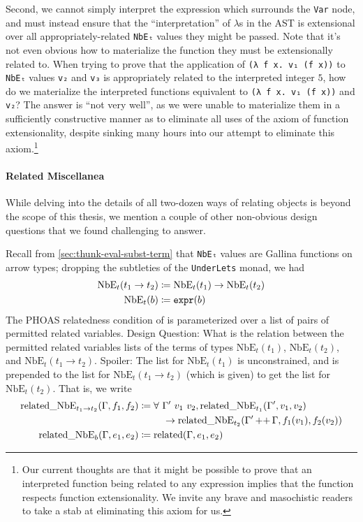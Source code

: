 Second, we cannot simply interpret the expression which surrounds the \texttt{Var} node, and must instead ensure that the ``interpretation'' of $\lambda$s in the AST is extensional over all appropriately-related \texttt{NbEₜ} values they might be passed.
Note that it's not even obvious how to materialize the function they must be extensionally related to.
When trying to prove that the application of \texttt{(λ f x. v₁ (f x))} to \texttt{NbEₜ} values \texttt{v₂} and \texttt{v₃} is appropriately related to the interpreted integer $5$, how do we materialize the interpreted functions equivalent to \texttt{(λ f x. v₁ (f x))} and \texttt{v₂}?
The answer is ``not very well'', as we were unable to materialize them in a sufficiently constructive manner as to eliminate all uses of the axiom of function extensionality, despite sinking many hours into our attempt to eliminate this axiom.\footnote{%
  Our current thoughts are that it might be possible to prove that an interpreted function being related to any expression implies that the function respects function extensionality.
  We invite any brave and masochistic readers to take a stab at eliminating this axiom for us.%
}

\paragraph{Related Miscellanea}
While delving into the details of all two-dozen ways of relating objects is beyond the scope of this thesis, we mention a couple of other non-obvious design questions that we found challenging to answer.

Recall from \autoref{sec:thunk-eval-subst-term} that \texttt{NbEₜ} values are Gallina functions on arrow types; dropping the subtleties of the \texttt{UnderLets} monad, we had
\begin{align*}
  \text{NbE}_t(t_1 \to t_2) & \coloneqq \text{NbE}_t(t_1) \to \text{NbE}_t(t_2) \\
  \text{NbE}_t(b) & \coloneqq \texttt{expr}(b)
\end{align*}
The PHOAS relatedness condition of  is parameterized over a list of pairs of permitted related variables.
Design Question: What is the relation between the permitted related variables lists of the terms of types $\text{NbE}_t(t_1)$, $\text{NbE}_t(t_2)$, and $\text{NbE}_t(t_1 \to t_2)$.
Spoiler: The list for $\text{NbE}_t(t_1)$ is unconstrained, and is prepended to the list for $\text{NbE}_t(t_1 \to t_2)$ (which is given) to get the list for $\text{NbE}_t(t_2)$.
That is, we write
\begin{align*}
  \text{related\_NbE}_{t_1 \to t_2}(\Gamma, f_1, f_2) & \defeq \forall\ \Gamma'\ v_1\ v_2, \text{related\_NbE}_{t_1}(\Gamma', v_1, v_2) \\
  & \phantom{\defeq\forall~~}\to \text{related\_NbE}_{t_2}(\Gamma' \mathop{++} \Gamma, f_1(v_1), f_2(v_2)) \\
  \text{related\_NbE}_b(\Gamma, e_1, e_2) & \defeq \text{related}(\Gamma, e_1, e_2)
\end{align*}

